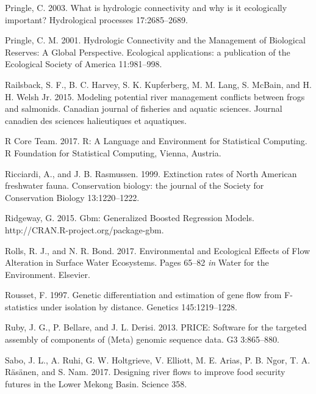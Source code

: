 \documentclass[proquest,12pt,final]{ucthesis-CA2012} %
\begin{document}
\begin{ucmainmatter}
\leavevmode\hypertarget{ref-pringle_what_2003}{}%
Pringle, C. 2003. What is hydrologic connectivity and why is it
ecologically important? Hydrological processes 17:2685--2689.

\leavevmode\hypertarget{ref-pringle_hydrologic_2001}{}%
Pringle, C. M. 2001. Hydrologic Connectivity and the Management of
Biological Reserves: A Global Perspective. Ecological applications: a
publication of the Ecological Society of America 11:981--998.

\leavevmode\hypertarget{ref-railsback_modeling_2015}{}%
Railsback, S. F., B. C. Harvey, S. K. Kupferberg, M. M. Lang, S. McBain,
and H. H. Welsh Jr. 2015. Modeling potential river management conflicts
between frogs and salmonids. Canadian journal of fisheries and aquatic
sciences. Journal canadien des sciences halieutiques et aquatiques.

\leavevmode\hypertarget{ref-r_core_team_r_2017}{}%
R Core Team. 2017. R: A Language and Environment for Statistical
Computing. R Foundation for Statistical Computing, Vienna, Austria.

\leavevmode\hypertarget{ref-ricciardi_extinction_1999}{}%
Ricciardi, A., and J. B. Rasmussen. 1999. Extinction rates of North
American freshwater fauna. Conservation biology: the journal of the
Society for Conservation Biology 13:1220--1222.

\leavevmode\hypertarget{ref-ridgeway_gbm_2015}{}%
Ridgeway, G. 2015. Gbm: Generalized Boosted Regression Models.
http://CRAN.R-project.org/package-gbm.

\leavevmode\hypertarget{ref-rolls_environmental_2017}{}%
Rolls, R. J., and N. R. Bond. 2017. Environmental and Ecological Effects
of Flow Alteration in Surface Water Ecosystems. Pages 65--82 \emph{in}
Water for the Environment. Elsevier.

\leavevmode\hypertarget{ref-rousset_genetic_1997}{}%
Rousset, F. 1997. Genetic differentiation and estimation of gene flow
from F-statistics under isolation by distance. Genetics 145:1219--1228.

\leavevmode\hypertarget{ref-ruby_price_2013}{}%
Ruby, J. G., P. Bellare, and J. L. Derisi. 2013. PRICE: Software for the
targeted assembly of components of (Meta) genomic sequence data. G3
3:865--880.

\leavevmode\hypertarget{ref-sabo_designing_2017}{}%
Sabo, J. L., A. Ruhi, G. W. Holtgrieve, V. Elliott, M. E. Arias, P. B.
Ngor, T. A. Räsänen, and S. Nam. 2017. Designing river flows to improve
food security futures in the Lower Mekong Basin. Science 358.


\end{ucmainmatter}
\end{document}
